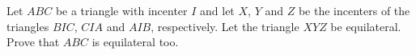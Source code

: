 Let $ABC$ be a triangle with incenter $I$ and let $X$, $Y$ and $Z$ be the incenters of the triangles $BIC$, $CIA$ and $AIB$, respectively. Let the triangle $XYZ$ be equilateral. Prove that $ABC$ is equilateral too.
